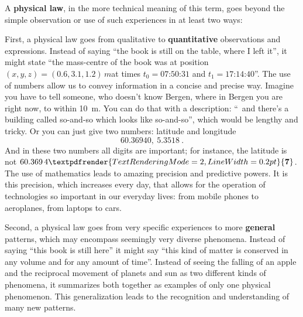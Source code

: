 \documentclass[a4paper,12pt,%
onecolumn,oneside,%
british%
]{memoir}
\renewcommand*{\bm}[1]{\textpdfrender{TextRenderingMode=2,LineWidth=0.2pt}{\boldsymbol{#1}}}
\renewcommand*{\|}[1][]{\nonscript\:#1\vert\nonscript\:\mathopen{}}
\newcommand*{\yti}{t_{0}}
\newcommand*{\ytf}{t_{1}}
\begin{document}
A \textbf{physical law}, in the more technical meaning of this term, goes beyond the simple observation or use of such experiences in at least two ways:

First, a physical law goes from qualitative to \textbf{quantitative} observations and expressions. Instead of saying \enquote{the book is still on the table, where I left it}, it might state \enquote{the mass-centre of the book was at position\enskip$(x,y,z)=(0.6,3.1,1.2)\,\unit{m}$\enskip at times $\yti = \text{07:50:31}$ and $\ytf = \text{17:14:40}$}. The use of numbers allow us to convey information in a concise and precise way. Imagine you have to tell someone, who doesn't know Bergen, where in Bergen you are right now, to within \qty{10}{m}. You can do that with a description: \enquote{\textellipsis\ and there's a building called so-and-so which looks like so-and-so\textellipsis}, which would be lengthy and tricky. Or you can just give two numbers: latitude and longitude
\begin{equation*}
  \num{60.36940},\ \num{5.3518} \ .
\end{equation*}
And in these two numbers all digits are important; for instance, the latitude is not \ensuremath{60.369\,4\bm{7}}. The use of mathematics leads to amazing precision and predictive powers. It is this precision, which increases every day, that allows for the operation of technologies so important in our everyday lives: from mobile phones to aeroplanes, from laptops to cars.
%
%

Second, a physical law goes from very specific experiences to more \textbf{general} patterns, which may encompass seemingly very diverse phenomena. Instead of saying \enquote{this book is still here} it might say \enquote{this kind of matter is conserved in any volume and for any amount of time}. Instead of seeing the falling of an apple and the reciprocal movement of planets and sun as two different kinds of phenomena, it summarizes both together as examples of only one physical phenomenon. This generalization leads to the recognition and understanding of many new patterns.

\medskip
\end{document}
